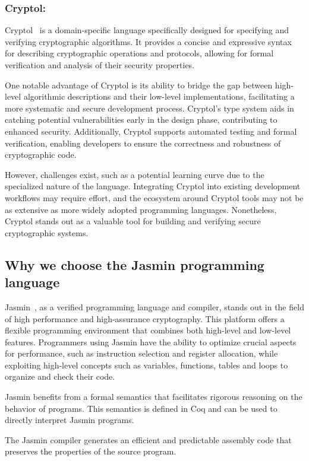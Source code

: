 \documentclass[runningheads]{llncs}
\begin{document}
\subsubsection{Cryptol:} 
Cryptol~\cite{cryptol} is a domain-specific language specifically designed for specifying and verifying cryptographic algorithms. It provides a concise and expressive syntax for describing cryptographic operations and protocols, allowing for formal verification and analysis of their security properties. 

One notable advantage of Cryptol is its ability to bridge the gap between high-level algorithmic descriptions and their low-level implementations, facilitating a more systematic and secure development process. Cryptol's type system aids in catching potential vulnerabilities early in the design phase, contributing to enhanced security. Additionally, Cryptol supports automated testing and formal verification, enabling developers to ensure the correctness and robustness of cryptographic code. 

However, challenges exist, such as a potential learning curve due to the specialized nature of the language. Integrating Cryptol into existing development workflows may require effort, and the ecosystem around Cryptol tools may not be as extensive as more widely adopted programming languages. Nonetheless, Cryptol stands out as a valuable tool for building and verifying secure cryptographic systems.

\subsection{Why we choose the Jasmin programming language}
Jasmin~\cite{jasmin_paper}, as a verified programming language and compiler, stands out in the field of high performance and high-assurance cryptography. This platform offers a flexible programming environment that combines both high-level and low-level features. Programmers using Jasmin have the ability to optimize crucial aspects for performance, such as instruction selection and register allocation, while exploiting high-level concepts such as variables, functions, tables and loops to organize and check their code.

Jasmin benefits from a formal semantics that facilitates rigorous reasoning on the behavior of programs. This semantics is defined in Coq and can be used to directly interpret Jasmin programs.

The Jasmin compiler generates an efficient and predictable assembly code that preserves the properties of the source program.
\end{document}
